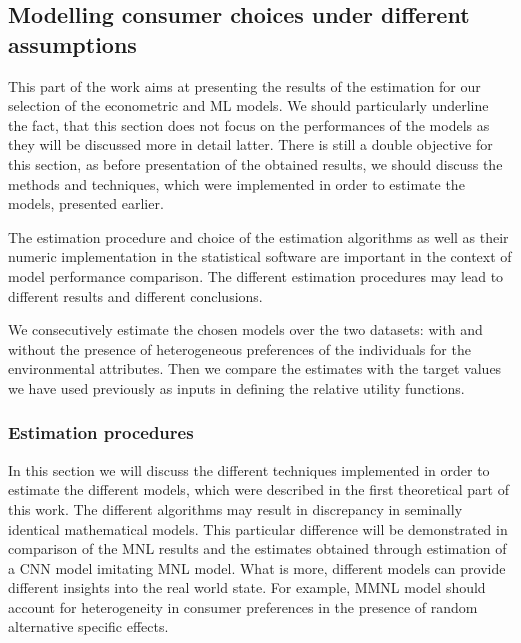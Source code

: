 \documentclass[12pt,]{article}
\begin{document}
\FloatBarrier

\hypertarget{modelling-consumer-choices-under-different-assumptions}{%
\subsection{Modelling consumer choices under different
assumptions}\label{modelling-consumer-choices-under-different-assumptions}}

This part of the work aims at presenting the results of the estimation
for our selection of the econometric and ML models. We should
particularly underline the fact, that this section does not focus on the
performances of the models as they will be discussed more in detail
latter. There is still a double objective for this section, as before
presentation of the obtained results, we should discuss the methods and
techniques, which were implemented in order to estimate the models,
presented earlier.

The estimation procedure and choice of the estimation algorithms as well
as their numeric implementation in the statistical software are
important in the context of model performance comparison. The different
estimation procedures may lead to different results and different
conclusions.

We consecutively estimate the chosen models over the two datasets: with
and without the presence of heterogeneous preferences of the individuals
for the environmental attributes. Then we compare the estimates with the
target values we have used previously as inputs in defining the relative
utility functions.

\hypertarget{estimation-procedures}{%
\subsubsection{Estimation procedures}\label{estimation-procedures}}

In this section we will discuss the different techniques implemented in
order to estimate the different models, which were described in the
first theoretical part of this work. The different algorithms may result
in discrepancy in seminally identical mathematical models. This
particular difference will be demonstrated in comparison of the MNL
results and the estimates obtained through estimation of a CNN model
imitating MNL model. What is more, different models can provide
different insights into the real world state. For example, MMNL model
should account for heterogeneity in consumer preferences in the presence
of random alternative specific effects.
\end{document}
